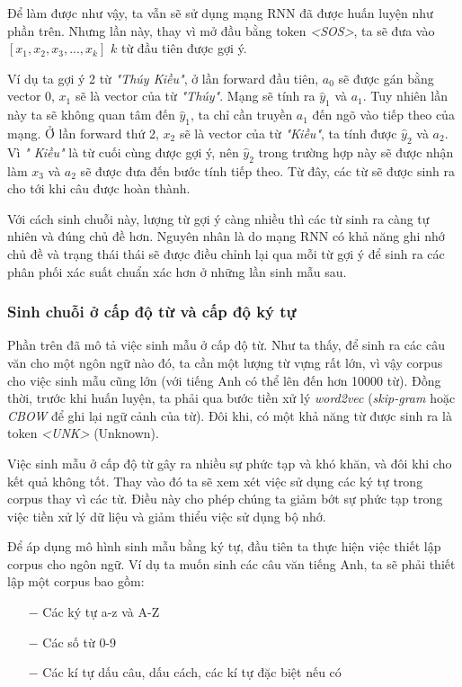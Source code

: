Để làm được như vậy, ta vẫn sẽ sử dụng mạng RNN đã được huấn luyện như phần trên. Nhưng lần này, thay vì mở đầu bằng token \textit{<SOS>}, ta sẽ đưa vào $[x_1, x_2, x_3,...,x_k]$ $k$ từ đầu tiên được gợi ý.

Ví dụ ta gợi ý 2 từ \textit{"Thúy Kiều"}, ở lần forward đầu tiên, $a_0$ sẽ được gán bằng vector $0$, $x_1$ sẽ là vector của từ \textit{"Thúy"}. Mạng sẽ tính ra $\hat{y}_1$ và $a_1$. Tuy nhiên lần này ta sẽ không quan tâm đến $\hat{y}_1$, ta chỉ cần truyền $a_1$ đến ngõ vào tiếp theo của mạng. Ở lần forward thứ 2, $x_2$ sẽ là vector của từ \textit{"Kiều"}, ta tính được $\hat{y}_2$ và $a_2$. Vì \textit{"
Kiều"} là từ cuối cùng được gợi ý, nên $\hat{y}_2$ trong trường hợp này sẽ được nhận làm $x_3$ và $a_2$ sẽ được đưa đến bước tính tiếp theo. Từ đây, các từ sẽ được sinh ra cho tới khi câu được hoàn thành.

Với cách sinh chuỗi này, lượng từ gợi ý càng nhiều thì các từ sinh ra càng tự nhiên và đúng chủ đề hơn. Nguyên nhân là do mạng RNN có khả năng ghi nhớ chủ đề và trạng thái thái sẽ được điều chỉnh lại qua mỗi từ gợi ý để sinh ra các phân phối xác suất chuẩn xác hơn ở những lần sinh mẫu sau.

\subsubsection{Sinh chuỗi ở cấp độ từ và cấp độ ký tự}
Phần trên đã mô tả việc sinh mẫu ở cấp độ từ. Như ta thấy, để sinh ra các câu văn cho một ngôn ngữ nào đó, ta cần một lượng từ vựng rất lớn, vì vậy corpus cho việc sinh mẫu cũng lớn (với tiếng Anh có thể lên đến hơn 10000 từ). Đồng thời, trước khi huấn luyện, ta phải qua bước tiền xử lý \textit{word2vec} (\textit{skip-gram} hoặc \textit{CBOW} để ghi lại ngữ cảnh của từ). Đôi khi, có một khả năng từ được sinh ra là token \textit{<UNK>} (Unknown). 

Việc sinh mẫu ở cấp độ từ gây ra nhiều sự phức tạp và khó khăn, và đôi khi cho kết quả không tốt. Thay vào đó ta sẽ xem xét việc sử dụng các ký tự trong corpus thay vì các từ. Điều này cho phép chúng ta giảm bớt sự phức tạp trong việc tiền xử lý dữ liệu và giảm thiểu việc sử dụng bộ nhớ.

Để áp dụng mô hình sinh mẫu bằng ký tự, đầu tiên ta thực hiện việc thiết lập corpus cho ngôn ngữ. Ví dụ ta muốn sinh các câu văn tiếng Anh, ta sẽ phải thiết lập một corpus bao gồm:
\begin{itemize}
    \item[$-$] Các ký tự a-z và A-Z
    \item[$-$] Các số từ 0-9
    \item[$-$] Các kí tự dấu câu, dấu cách, các kí tự đặc biệt nếu có
\end{itemize}

